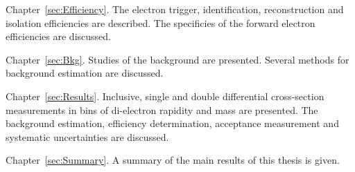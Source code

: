 \begin{description}
\item Chapter~\ref{sec:Efficiency}. The electron trigger, identification, reconstruction and isolation efficiencies are described. The specificies of the forward electron efficiencies are discussed.

\item Chapter~\ref{sec:Bkg}. Studies of the background are presented. Several methods for background estimation are discussed.

\item Chapter~\ref{sec:Results}. Inclusive, single and double differential cross-section measurements in bins of di-electron rapidity and mass are presented. The background estimation, efficiency determination, acceptance measurement and systematic uncertainties are discussed.

\item Chapter~\ref{sec:Summary}. A summary of the main results of this thesis is given.
\end{description}
